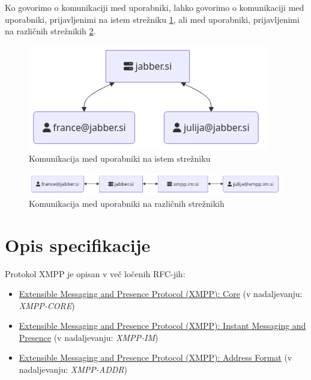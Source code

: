 \documentclass[11pt]{article}
\begin{document}
Ko govorimo o komunikaciji med uporabniki, lahko govorimo o
komunikaciji med uporabniki, prijavljenimi na istem strežniku
\ref{fig:org360b3d3}, ali med uporabniki, prijavljenimi na različnih
strežnikih \ref{fig:org4adcf98}.

\begin{figure}[H]
\centering
\includegraphics[width=.9\linewidth]{images/local-server.png}
\caption{\label{fig:org360b3d3}Komunikacija med uporabniki na istem strežniku}
\end{figure}

\begin{figure}[H]
\centering
\includegraphics[width=.9\linewidth]{images/cross-server.png}
\caption{\label{fig:org4adcf98}Komunikacija med uporabniki na različnih strežnikih}
\end{figure}

\section{Opis specifikacije}
\label{sec:org5b1ac5e}

Protokol XMPP je opisan v več ločenih RFC-jih:

\begin{itemize}
\item \href{https://datatracker.ietf.org/doc/rfc6120/}{Extensible Messaging and Presence Protocol (XMPP): Core} (v
nadaljevanju: \emph{XMPP-CORE})
\item \href{https://datatracker.ietf.org/doc/rfc6121/}{Extensible Messaging
and Presence Protocol (XMPP): Instant Messaging and Presence} (v
nadaljevanju: \emph{XMPP-IM})
\item \href{https://datatracker.ietf.org/doc/rfc7622/}{Extensible Messaging and Presence Protocol (XMPP): Address Format} (v
nadaljevanju: \emph{XMPP-ADDR})
\end{itemize}
\end{document}

